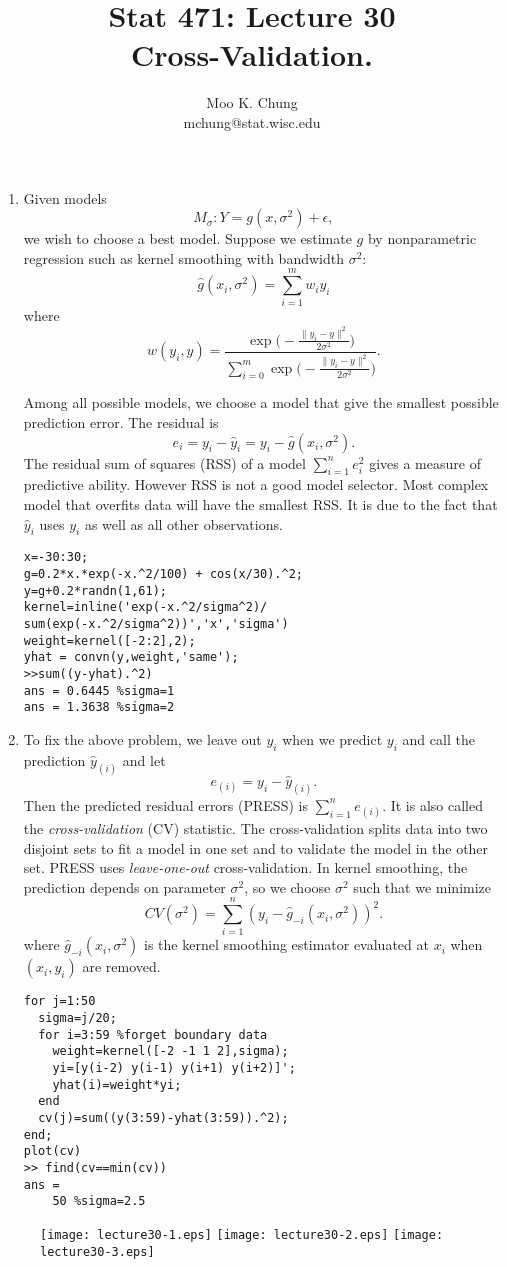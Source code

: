 \documentclass[11pt,twocolumn]{article} %
\begin{document}
\title{Stat 471: Lecture 30\\
Cross-Validation.}
\author{Moo K. Chung\\
mchung@stat.wisc.edu}
\maketitle \thispagestyle{empty}
\begin{enumerate}
\item Given models $$M_{\sigma}: Y = g(x, \sigma^2) + \epsilon,$$
we wish to choose a best model. Suppose we estimate $g$ by
nonparametric regression such as kernel smoothing with bandwidth
$\sigma^2$: $$\hat g(x_i,\sigma^2) = \sum_{i=1}^m w_iy_i$$ where
$$ w(y_i,y) = \frac{\exp \big(-\frac{\|y_i - y\|^2}{2\sigma^2} \big)}
{\sum_{i=0}^m \exp \big(-\frac{\|y_i - y\|^2}{2\sigma^2}\big)}.$$


Among all possible models, we choose a model that give the
smallest possible prediction error. The residual is $$e_i = y_i -
\hat y_i = y_i - \widehat g(x_i,\sigma^2).$$ The residual sum of
squares (RSS) of a model $\sum_{i=1}^n e_i^2$ gives a measure of
predictive ability. However RSS is not a good model selector. Most
complex model that overfits data will have the smallest RSS. It is
due to the fact that $\hat y_i$ uses $y_i$ as well as all other
observations.
\begin{verbatim}
x=-30:30;
g=0.2*x.*exp(-x.^2/100) + cos(x/30).^2;
y=g+0.2*randn(1,61);
kernel=inline('exp(-x.^2/sigma^2)/
sum(exp(-x.^2/sigma^2))','x','sigma')
weight=kernel([-2:2],2);
yhat = convn(y,weight,'same');
>>sum((y-yhat).^2)
ans = 0.6445 %sigma=1
ans = 1.3638 %sigma=2
\end{verbatim}

\item To fix the above problem, we leave out $y_i$ when we predict
$y_i$ and call the prediction $\hat y_{(i)}$ and let
$$e_{(i)} = y_i - \hat y_{(i)}.$$
Then the predicted residual errors (PRESS) is $\sum_{i=1}^n
e_{(i)}$. It is also called the {\em cross-validation} (CV)
statistic. The cross-validation splits data into two disjoint sets
to fit a model in one set and to validate the model in the other
set. PRESS uses {\em leave-one-out} cross-validation. In kernel
smoothing, the prediction depends on parameter $\sigma^2$, so we
choose $\sigma^2$ such that we minimize
$$CV(\sigma^2) = \sum_{i=1}^n (y_i - \widehat g_{-i}(x_i,\sigma^2))^2.$$
where $\widehat g_{-i}(x_i,\sigma^2)$ is the kernel smoothing
estimator evaluated at $x_i$ when $(x_i,y_i)$ are removed.
\begin{verbatim}
for j=1:50
  sigma=j/20;
  for i=3:59 %forget boundary data
    weight=kernel([-2 -1 1 2],sigma);
    yi=[y(i-2) y(i-1) y(i+1) y(i+2)]';
    yhat(i)=weight*yi;
  end
  cv(j)=sum((y(3:59)-yhat(3:59)).^2);
end;
plot(cv)
>> find(cv==min(cv))
ans =
    50 %sigma=2.5
\end{verbatim}
\end{enumerate}
\begin{figure}[t]
\centering
\renewcommand{\baselinestretch}{1}
\texttt{[image: lecture30-1.eps]}
\texttt{[image: lecture30-2.eps]}
\texttt{[image: lecture30-3.eps]}
\end{figure}
\end{document}

